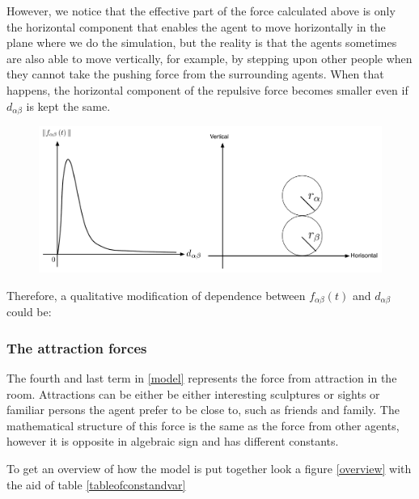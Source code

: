However, we notice that the effective part of the force calculated above is only the horizontal 
component that enables the agent to move horizontally in the plane where we do the simulation, 
but the reality is that the agents sometimes are also able to move vertically, for example, 
by stepping upon other people when they cannot take the pushing force from the surrounding agents. 
When that happens, the horizontal component of the repulsive force becomes smaller even if $ d_{\alpha\beta} $ 
is kept the same.	

\begin{figure}[ht]   
\centering
    {\includegraphics[scale=0.35]{Figures/ForceOverlapping.pdf}} 
    \caption{}
    \label{forceoverlapping}
\end{figure}

Therefore, a qualitative modification of dependence between $ f_{\alpha\beta}(t) $ and $ d_{\alpha\beta} $ could be:


\subsubsection{The attraction forces}
The fourth and last term in \eqref{model} represents the force from attraction 
in the room. Attractions can be either be either interesting sculptures or 
sights or familiar persons the agent prefer to be close to, such as friends 
and family. The mathematical structure of this force is the same as the force 
from other agents, however it is opposite in algebraic sign and has different 
constants. 

To get an overview of how the model is put together look a figure \ref{overview}
with the aid of table \ref{tableofconstandvar}

